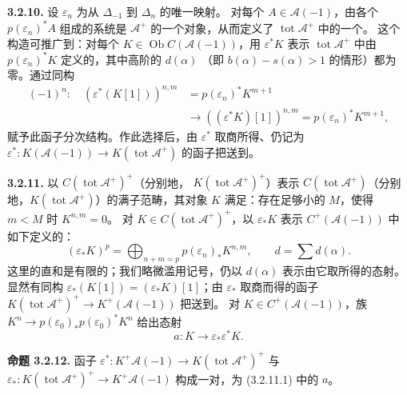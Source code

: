 \par\medskip\noindent\textbf{3.2.10.}
设 $\varepsilon_n$ 为从 $\Delta_{-1}$ 到 $\Delta_n$ 的唯一映射。
对每个 $A\in\mathcal A(-1)$，由各个 $p(\varepsilon_n)^*A$ 组成的系统是
$\mathcal A^+$ 的一个对象，从而定义了
$\operatorname{tot}\mathcal A^+$ 中的一个。
这个构造可推广到：对每个
$K\in\operatorname{Ob}C(\mathcal A(-1))$，用 $\varepsilon^*K$ 表示
$\operatorname{tot}\mathcal A^+$ 中由
$p(\varepsilon_n)^*K$ 定义的，其中高阶的 $d(\alpha)$
（即 $b(\alpha)-s(\alpha)>1$ 的情形）都为零。通过同构
\[
\begin{aligned}
(-1)^n:\quad(\varepsilon^*(K[1]))^{n,m}
 &=p(\varepsilon_n)^*K^{m+1}\\
 &\longrightarrow((\varepsilon^*K)[1])^{n,m}
 =p(\varepsilon_n)^*K^{m+1},
\end{aligned}
\]
赋予此函子分次结构。作此选择后，由 $\varepsilon^*$ 取商所得、仍记为
$\varepsilon^*:K(\mathcal A(-1))\longrightarrow K(\operatorname{tot}\mathcal A^+)$
的函子把送到。

\par\medskip\noindent\textbf{3.2.11.}
以 $C(\operatorname{tot}\mathcal A^+)^+$（分别地，
$K(\operatorname{tot}\mathcal A^+)^+$）表示
$C(\operatorname{tot}\mathcal A^+)$（分别地，$K(\operatorname{tot}\mathcal A^+)$）的满子范畴，其对象 $K$ 满足：存在足够小的 $M$，使得 $m<M$ 时
$K^{n,m}=0$。
对 $K\in C(\operatorname{tot}\mathcal A^+)^+$，以 $\varepsilon_*K$ 表示
$C^+(\mathcal A(-1))$ 中如下定义的：
\[
(\varepsilon_*K)^p=\bigoplus_{n+m=p}p(\varepsilon_n)_*K^{n,m},
\qquad d=\sum d(\alpha).
\]
这里的直和是有限的；我们略微滥用记号，仍以 $d(\alpha)$ 表示由它取所得的态射。
显然有同构 $\varepsilon_*(K[1])=(\varepsilon_*K)[1]$；由
$\varepsilon_*$ 取商而得的函子
$K(\operatorname{tot}\mathcal A^+)^+\longrightarrow K^+(\mathcal A(-1))$
把送到。
对 $K\in C^+(\mathcal A(-1))$，族
$K^n\longrightarrow p(\varepsilon_0)_*p(\varepsilon_0)^*K^n$
给出态射
\begin{equation*}
a:K\longrightarrow\varepsilon_*\varepsilon^*K.
\tag{3.2.11.1}
\end{equation*}

\par\medskip\noindent\textbf{命题 3.2.12.}
函子
$\varepsilon^*:K^+\mathcal A(-1)\longrightarrow K(\operatorname{tot}\mathcal A^+)^+$
与
$\varepsilon_*:K(\operatorname{tot}\mathcal A^+)^+\longrightarrow K^+\mathcal A(-1)$
构成一对，为 (3.2.11.1) 中的 $a$。

